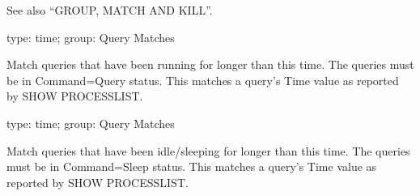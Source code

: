 \documentclass[letterpaper,10pt,english]{sphinxmanual}
\begin{document}
\sphinxAtStartPar
See also “GROUP, MATCH AND KILL”.

\begin{fulllineitems}
\label{\detokenize{mariadb-kill:cmdoption-mariadb-kill-busy-time}}
\sphinxAtStartPar
type: time; group: Query Matches

\sphinxAtStartPar
Match queries that have been running for longer than this time.  The queries
must be in Command=Query status.  This matches a query’s Time value as
reported by SHOW PROCESSLIST.

\end{fulllineitems}


\begin{fulllineitems}
\label{\detokenize{mariadb-kill:cmdoption-mariadb-kill-idle-time}}
\sphinxAtStartPar
type: time; group: Query Matches

\sphinxAtStartPar
Match queries that have been idle/sleeping for longer than this time.
The queries must be in Command=Sleep status.  This matches a query’s Time
value as reported by SHOW PROCESSLIST.

\end{fulllineitems}

\end{document}
